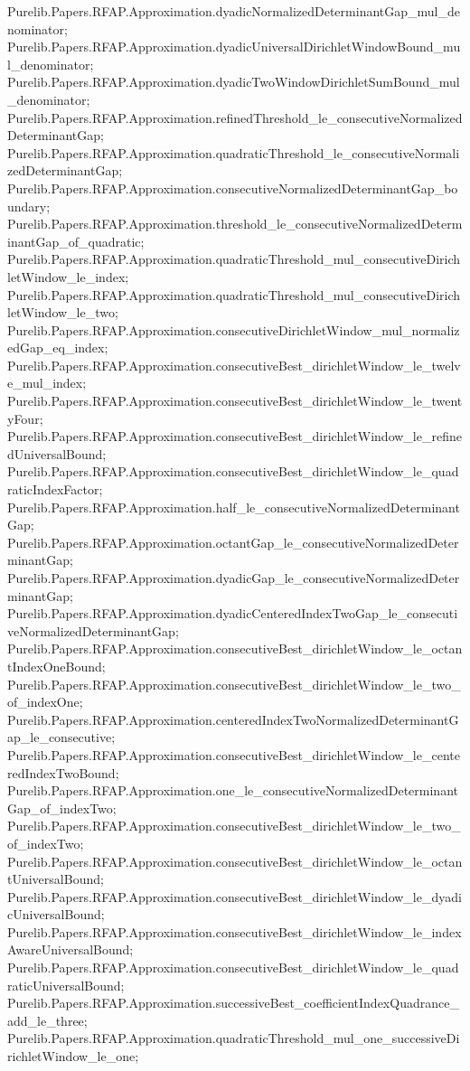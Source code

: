 \documentclass[11pt]{article}
\begin{document}
{Purelib.Papers.RFAP.Approximation.dyadicNormalizedDeterminantGap_mul_denominator;
Purelib.Papers.RFAP.Approximation.dyadicUniversalDirichletWindowBound_mul_denominator;
Purelib.Papers.RFAP.Approximation.dyadicTwoWindowDirichletSumBound_mul_denominator;
Purelib.Papers.RFAP.Approximation.refinedThreshold_le_consecutiveNormalizedDeterminantGap;
Purelib.Papers.RFAP.Approximation.quadraticThreshold_le_consecutiveNormalizedDeterminantGap;
Purelib.Papers.RFAP.Approximation.consecutiveNormalizedDeterminantGap_boundary;
Purelib.Papers.RFAP.Approximation.threshold_le_consecutiveNormalizedDeterminantGap_of_quadratic;
Purelib.Papers.RFAP.Approximation.quadraticThreshold_mul_consecutiveDirichletWindow_le_index;
Purelib.Papers.RFAP.Approximation.quadraticThreshold_mul_consecutiveDirichletWindow_le_two;
Purelib.Papers.RFAP.Approximation.consecutiveDirichletWindow_mul_normalizedGap_eq_index;
Purelib.Papers.RFAP.Approximation.consecutiveBest_dirichletWindow_le_twelve_mul_index;
Purelib.Papers.RFAP.Approximation.consecutiveBest_dirichletWindow_le_twentyFour;
Purelib.Papers.RFAP.Approximation.consecutiveBest_dirichletWindow_le_refinedUniversalBound;
Purelib.Papers.RFAP.Approximation.consecutiveBest_dirichletWindow_le_quadraticIndexFactor;
Purelib.Papers.RFAP.Approximation.half_le_consecutiveNormalizedDeterminantGap;
Purelib.Papers.RFAP.Approximation.octantGap_le_consecutiveNormalizedDeterminantGap;
Purelib.Papers.RFAP.Approximation.dyadicGap_le_consecutiveNormalizedDeterminantGap;
Purelib.Papers.RFAP.Approximation.dyadicCenteredIndexTwoGap_le_consecutiveNormalizedDeterminantGap;
Purelib.Papers.RFAP.Approximation.consecutiveBest_dirichletWindow_le_octantIndexOneBound;
Purelib.Papers.RFAP.Approximation.consecutiveBest_dirichletWindow_le_two_of_indexOne;
Purelib.Papers.RFAP.Approximation.centeredIndexTwoNormalizedDeterminantGap_le_consecutive;
Purelib.Papers.RFAP.Approximation.consecutiveBest_dirichletWindow_le_centeredIndexTwoBound;
Purelib.Papers.RFAP.Approximation.one_le_consecutiveNormalizedDeterminantGap_of_indexTwo;
Purelib.Papers.RFAP.Approximation.consecutiveBest_dirichletWindow_le_two_of_indexTwo;
Purelib.Papers.RFAP.Approximation.consecutiveBest_dirichletWindow_le_octantUniversalBound;
Purelib.Papers.RFAP.Approximation.consecutiveBest_dirichletWindow_le_dyadicUniversalBound;
Purelib.Papers.RFAP.Approximation.consecutiveBest_dirichletWindow_le_indexAwareUniversalBound;
Purelib.Papers.RFAP.Approximation.consecutiveBest_dirichletWindow_le_quadraticUniversalBound;
Purelib.Papers.RFAP.Approximation.successiveBest_coefficientIndexQuadrance_add_le_three;
Purelib.Papers.RFAP.Approximation.quadraticThreshold_mul_one_successiveDirichletWindow_le_one;
}
\end{document}

